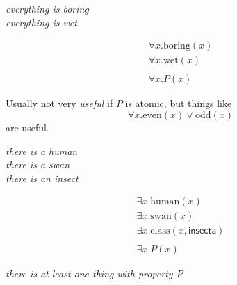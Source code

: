 \documentclass[xetex,aspectratio=169,14pt,hyperref={pdfpagelabels=true,pdflang={en-GB}}]{beamer}
\begin{document}
\begin{frame}[t]

  \begin{center}
    \emph{everything is boring} \\
    \emph{everything is wet}
  \end{center}

  \begin{displaymath}
    \begin{array}{c}
      \forall x. \mathrm{boring}(x) \\
      \forall x. \mathrm{wet}(x) \\
      \\
      \forall x. P(x)
    \end{array}
  \end{displaymath}

  \bigskip

  Usually not very \emph{useful} if $P$ is atomic, but things like
  \begin{displaymath}
    \forall x. \mathrm{even}(x) \lor \mathrm{odd}(x)
  \end{displaymath}
  are useful.

\end{frame}


\begin{frame}[t]

  \begin{center}
    \emph{there is a human} \\
    \emph{there is a swan} \\
    \emph{there is an insect}
  \end{center}

  \begin{displaymath}
    \begin{array}{c}
      \exists x. \mathrm{human}(x) \\
      \exists x. \mathrm{swan}(x) \\
      \exists x. \mathrm{class}(x,\mathsf{insecta}) \\
      \\
      \exists x. P(x)
    \end{array}
  \end{displaymath}

  \bigskip

  \emph{there is at least one thing with property $P$}

\end{frame}
\end{document}
